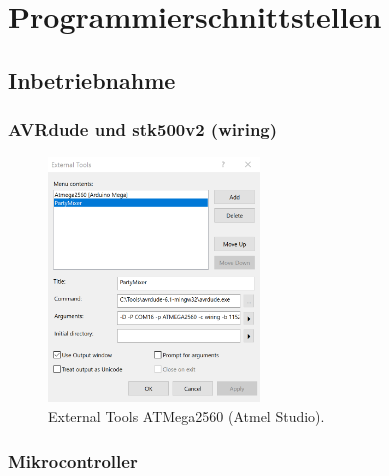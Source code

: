 
\section{Programmierschnittstellen}\label{Appendix:Programmierschnittstellen}
\subsection{Inbetriebnahme}


\subsubsection{AVRdude und stk500v2 (wiring)}\mbox{}

\begin{figure}[H]
	\centering
	\includegraphics[width=0.5\textwidth]{graphics/AtmelStudio_External_Tools}
	\caption{External Tools ATMega2560 (Atmel Studio).}
	\label{fig:AtmelStudio_External_Tools}
\end{figure}

\subsubsection{Mikrocontroller}\label{Appendix:Handshake_uC}

